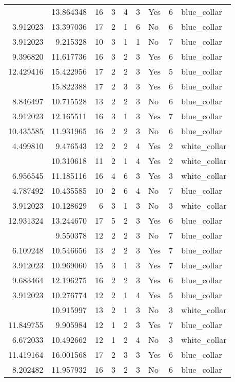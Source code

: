 \documentclass[
]{article}
\begin{document}
\begin{longtable}[t]{rrrrrllrl}
\addlinespace
11.608690 & 13.864348 & 16 & 3 & 4 & 3 & Yes & 6 & blue\_collar\\
3.912023 & 13.397036 & 17 & 2 & 1 & 6 & No & 6 & blue\_collar\\
3.912023 & 9.215328 & 10 & 3 & 1 & 1 & No & 7 & blue\_collar\\
9.396820 & 11.617736 & 16 & 3 & 2 & 3 & Yes & 6 & blue\_collar\\
12.429416 & 15.422956 & 17 & 2 & 2 & 3 & Yes & 5 & blue\_collar\\
\addlinespace
9.215328 & 15.822388 & 17 & 2 & 3 & 3 & Yes & 6 & blue\_collar\\
8.846497 & 10.715528 & 13 & 2 & 2 & 3 & No & 6 & blue\_collar\\
3.912023 & 12.165511 & 16 & 3 & 1 & 3 & Yes & 7 & blue\_collar\\
10.435585 & 11.931965 & 16 & 2 & 2 & 3 & No & 6 & blue\_collar\\
4.499810 & 9.476543 & 12 & 2 & 2 & 4 & Yes & 2 & white\_collar\\
\addlinespace
3.912023 & 10.310618 & 11 & 2 & 1 & 4 & Yes & 2 & white\_collar\\
6.956545 & 11.185116 & 16 & 4 & 6 & 3 & Yes & 3 & white\_collar\\
4.787492 & 10.435585 & 10 & 2 & 6 & 4 & No & 7 & blue\_collar\\
3.912023 & 10.128629 & 6 & 3 & 1 & 3 & No & 3 & white\_collar\\
12.931324 & 13.244670 & 17 & 5 & 2 & 3 & Yes & 6 & blue\_collar\\
\addlinespace
9.619133 & 9.550378 & 12 & 2 & 2 & 3 & No & 7 & blue\_collar\\
6.109248 & 10.546656 & 13 & 2 & 2 & 3 & Yes & 7 & blue\_collar\\
3.912023 & 10.969060 & 15 & 3 & 1 & 3 & Yes & 7 & blue\_collar\\
9.683464 & 12.196275 & 16 & 2 & 2 & 3 & Yes & 6 & blue\_collar\\
3.912023 & 10.276774 & 12 & 2 & 1 & 4 & Yes & 5 & blue\_collar\\
\addlinespace
3.912023 & 10.915997 & 13 & 2 & 1 & 3 & No & 3 & white\_collar\\
11.849755 & 9.905984 & 12 & 1 & 2 & 3 & Yes & 7 & blue\_collar\\
6.672033 & 10.492662 & 12 & 1 & 2 & 4 & No & 3 & white\_collar\\
11.419164 & 16.001568 & 17 & 2 & 3 & 3 & Yes & 6 & blue\_collar\\
8.202482 & 11.957932 & 16 & 3 & 2 & 3 & No & 6 & blue\_collar\\

\end{longtable}
\end{document}
